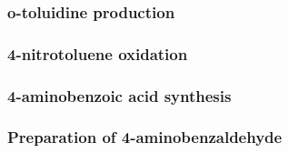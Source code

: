 \subsubsection{o-toluidine production}

\subsubsection{4-nitrotoluene oxidation}

\subsubsection{4-aminobenzoic acid synthesis}

\subsubsection{Preparation of 4-aminobenzaldehyde}


